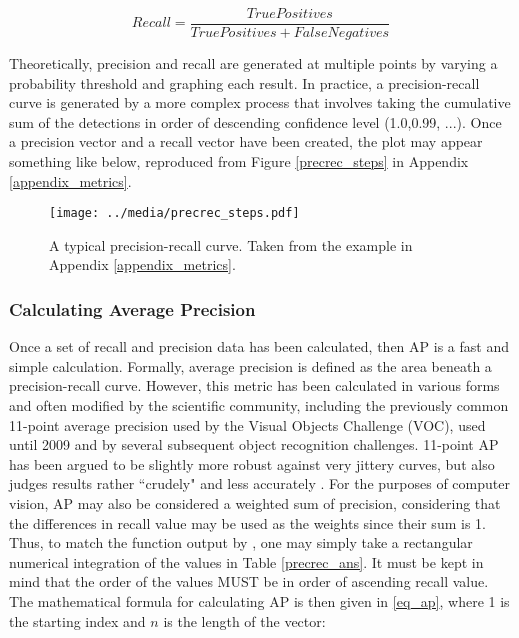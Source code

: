 \begin{equation}
Recall = \frac{TruePositives}{TruePositives + FalseNegatives}
\label{eq_rec}
\end{equation}

Theoretically, precision and recall are generated at multiple points by varying a probability threshold and graphing each result. In practice, a precision-recall curve is generated by a more complex process that involves taking the cumulative sum of the detections in order of descending confidence level (1.0,0.99, ...). Once a precision vector and a recall vector have been created, the plot may appear something like below, reproduced from Figure \ref{precrec_steps} in Appendix \ref{appendix_metrics}. 

\begin{figure}[H]
	\centering
	\texttt{[image: ../media/precrec\_steps.pdf]}
	\caption{A typical precision-recall curve. Taken from the example in Appendix \ref{appendix_metrics}.}
\end{figure}


\subsubsection{Calculating Average Precision}
Once a set of recall and precision data has been calculated, then AP is a fast and simple calculation. Formally, average precision is defined as the area beneath a precision-recall curve. However, this metric has been calculated in various forms and often modified by the scientific community, including the previously common 11-point average precision used by the Visual Objects Challenge (VOC), used until 2009 and by several subsequent object recognition challenges. 11-point AP has been argued to be slightly more robust against very jittery curves, but also judges results rather ``crudely" and less accurately \cite{everingham_pascal_2015}. For the purposes of computer vision, AP may also be considered a weighted sum of precision, considering that the differences in recall value may be used as the weights since their sum is 1. Thus, to match the function output by \cite{pedregosa_scikit-learn:_2011}, one may simply take a rectangular numerical integration of the values in Table \ref{precrec_ans}. It must be kept in mind that the order of the values MUST be in order of ascending recall value. The mathematical formula for calculating AP is then given in \ref{eq_ap}, where 1 is the starting index and $n$ is the length of the vector:

